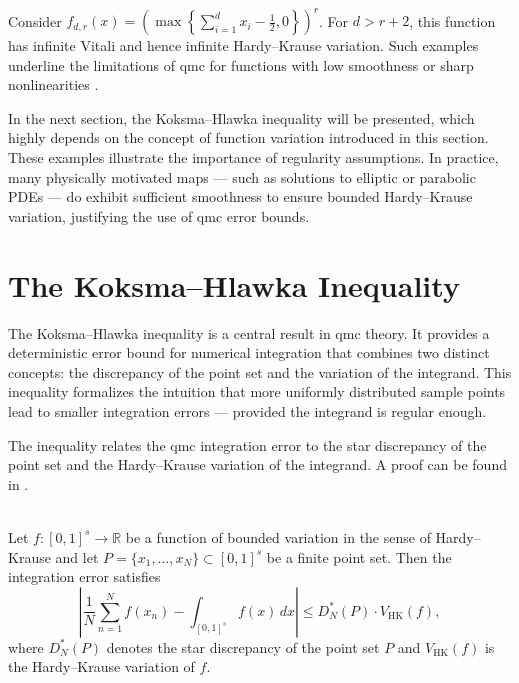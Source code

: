 \begin{example} \ \\
Consider $f_{d,r}(x) = \left( \max\left\{ \sum\limits_{i=1}^d x_i - \frac{1}{2}, 0
\right\} \right)^r$. For $d > r + 2$, this function has infinite Vitali and
hence infinite Hardy--Krause variation. Such examples underline the limitations
of \ac{qmc} for functions with low smoothness or sharp nonlinearities \cite[Prop.
16]{owen2005multidimensional}.
\end{example}

In the next section, the Koksma--Hlawka inequality will be presented, which
highly depends on the concept of function variation introduced in this section.
These examples illustrate the importance of regularity assumptions. In practice,
many physically motivated maps --- such as solutions to elliptic or parabolic
PDEs --- do exhibit sufficient smoothness to ensure bounded Hardy--Krause
variation, justifying the use of \ac{qmc} error bounds.

\section{The Koksma--Hlawka Inequality}

The Koksma--Hlawka inequality is a central result in \acl{qmc} theory. It
provides a deterministic error bound for numerical integration that combines two
distinct concepts: the discrepancy of the point set and the variation of the
integrand. This inequality formalizes the intuition that more uniformly
distributed sample points lead to smaller integration errors --- provided the
integrand is regular enough.

The inequality relates the \ac{qmc} integration error to the star discrepancy of
the point set and the Hardy--Krause variation of the integrand. A proof can be
found in \cite{caflisch1998monte}.

\begin{theorem} \ \\
\label{thm:koksma-hlawka}
Let $f \colon [0,1]^s \to \mathbb{R}$ be a function of bounded variation in the
sense of Hardy--Krause and let $P = \{x_1, \dots, x_N\} \subset [0,1]^s$ be a
finite point set. Then the integration error satisfies
\begin{equation}
    \left| \frac{1}{N} \sum_{n=1}^N f(x_n) - \int_{[0,1]^s} f(x) \, dx \right|
    \leq D_N^{*}(P) \cdot V_{\mathrm{HK}}(f),
\end{equation}
where $D_N^{*}(P)$ denotes the star discrepancy of the point set $P$ and
$V_{\mathrm{HK}}(f)$ is the Hardy--Krause variation of $f$.
\end{theorem}

